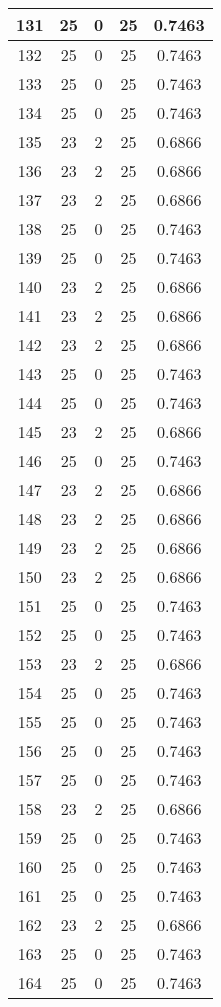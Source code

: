 \documentclass[letterpaper, 12pt]{article}
\begin{document}
\begin{longtable}{|c|c|c|c|c|}
\hline
131 & 25 & 0 & 25 & 0.7463 \\
\hline
132 & 25 & 0 & 25 & 0.7463 \\
\hline
133 & 25 & 0 & 25 & 0.7463 \\
\hline
134 & 25 & 0 & 25 & 0.7463 \\
\hline
135 & 23 & 2 & 25 & 0.6866 \\
\hline
136 & 23 & 2 & 25 & 0.6866 \\
\hline
137 & 23 & 2 & 25 & 0.6866 \\
\hline
138 & 25 & 0 & 25 & 0.7463 \\
\hline
139 & 25 & 0 & 25 & 0.7463 \\
\hline
140 & 23 & 2 & 25 & 0.6866 \\
\hline
141 & 23 & 2 & 25 & 0.6866 \\
\hline
142 & 23 & 2 & 25 & 0.6866 \\
\hline
143 & 25 & 0 & 25 & 0.7463 \\
\hline
144 & 25 & 0 & 25 & 0.7463 \\
\hline
145 & 23 & 2 & 25 & 0.6866 \\
\hline
146 & 25 & 0 & 25 & 0.7463 \\
\hline
147 & 23 & 2 & 25 & 0.6866 \\
\hline
148 & 23 & 2 & 25 & 0.6866 \\
\hline
149 & 23 & 2 & 25 & 0.6866 \\
\hline
150 & 23 & 2 & 25 & 0.6866 \\
\hline
151 & 25 & 0 & 25 & 0.7463 \\
\hline
152 & 25 & 0 & 25 & 0.7463 \\
\hline
153 & 23 & 2 & 25 & 0.6866 \\
\hline
154 & 25 & 0 & 25 & 0.7463 \\
\hline
155 & 25 & 0 & 25 & 0.7463 \\
\hline
156 & 25 & 0 & 25 & 0.7463 \\
\hline
157 & 25 & 0 & 25 & 0.7463 \\
\hline
158 & 23 & 2 & 25 & 0.6866 \\
\hline
159 & 25 & 0 & 25 & 0.7463 \\
\hline
160 & 25 & 0 & 25 & 0.7463 \\
\hline
161 & 25 & 0 & 25 & 0.7463 \\
\hline
162 & 23 & 2 & 25 & 0.6866 \\
\hline
163 & 25 & 0 & 25 & 0.7463 \\
\hline
164 & 25 & 0 & 25 & 0.7463 \\

\end{longtable}
\end{document}
